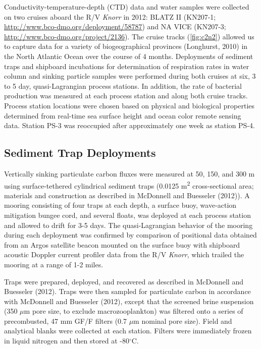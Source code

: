 Conductivity-temperature-depth (CTD) data and water samples were collected on two cruises aboard the R/V \emph{Knorr} in 2012: BLATZ II (KN207-1; \url{http://www.bco-dmo.org/deployment/58787}) and NA VICE (KN207-3; \url{http://www.bco-dmo.org/project/2136}). The cruise tracks (\autoref{fig:c2n2}) allowed us to capture data for a variety of biogeographical provinces (Longhurst, 2010) in the North Atlantic Ocean over the course of 4 months. Deployments of sediment traps and shipboard incubations for determination of respiration rates in water column and sinking particle samples were performed during both cruises at six, 3 to 5 day, quasi-Lagrangian process stations. In addition, the rate of bacterial production was measured at each process station and along both cruise tracks. Process station locations were chosen based on physical and biological properties determined from real-time sea surface height and ocean color remote sensing data. Station PS-3 was reoccupied after approximately one week as station PS-4.

\subsection{Sediment Trap Deployments}

Vertically sinking particulate carbon fluxes were measured at 50, 150, and 300 m using surface-tethered cylindrical sediment traps (0.0125 m\textsuperscript{2} cross-sectional area; materials and construction as described in McDonnell and Buesseler (2012)). A mooring consisting of four traps at each depth, a surface buoy, wave-action mitigation bungee cord, and several floats, was deployed at each process station and allowed to drift for 3-5 days. The quasi-Lagrangian behavior of the mooring during each deployment was confirmed by comparison of positional data obtained from an Argos satellite beacon mounted on the surface buoy with shipboard acoustic Doppler current profiler data from the R/V \emph{Knorr}, which trailed the mooring at a range of 1-2 miles.

Traps were prepared, deployed, and recovered as described in McDonnell and Buesseler (2012). Traps were then sampled for particulate carbon in accordance with McDonnell and Buesseler (2012), except that the screened brine suspension (350 $\mu$m pore size, to exclude macrozooplankton) was filtered onto a series of precombusted, 47 mm GF/F filters (0.7 $\mu$m nominal pore size). Field and analytical blanks were collected at each station. Filters were immediately frozen in liquid nitrogen and then stored at -80$^{\circ}$C.

